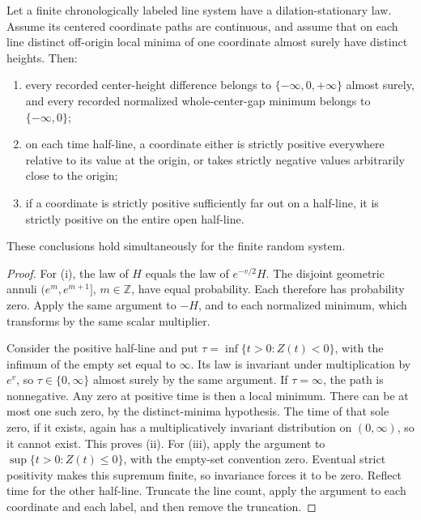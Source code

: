 \begin{lemma}\label{view:signs}
Let a finite chronologically labeled line system have a dilation-stationary
law.  Assume its centered coordinate paths are continuous, and assume that
on each line distinct off-origin local minima of one coordinate almost
surely have distinct heights.  Then:
\begin{enumerate}[label=(\roman*)]
\item every recorded center-height difference belongs to
$\{-\infty,0,+\infty\}$ almost surely, and every recorded normalized
whole-center-gap minimum belongs to $\{-\infty,0\}$;
\item on each time half-line, a coordinate either is strictly positive
everywhere relative to its value at the origin, or takes strictly negative
values arbitrarily close to the origin;
\item if a coordinate is strictly positive sufficiently far out on a
half-line, it is strictly positive on the entire open half-line.
\end{enumerate}
These conclusions hold simultaneously for the finite random system.
\end{lemma}

\begin{proof}
For (i), the law of $H$ equals the law of $e^{-v/2}H$.  The disjoint geometric
annuli $(e^m,e^{m+1}]$, $m\in\mathbb Z$, have equal probability.  Each
therefore has probability zero.  Apply the same argument to $-H$, and to
each normalized minimum, which transforms by the same scalar multiplier.

Consider the positive half-line and put
$\tau=\inf\{t>0:Z(t)<0\}$, with the infimum of the empty set equal to
$\infty$.  Its law is invariant under multiplication by $e^v$, so
$\tau\in\{0,\infty\}$ almost surely by the same argument.  If $\tau=\infty$,
the path is nonnegative.  Any zero at positive time is then a local minimum.
There can be at most one such zero, by the distinct-minima hypothesis.
The time of that sole zero, if it exists, again has a multiplicatively
invariant distribution on $(0,\infty)$, so it cannot exist.  This proves (ii).
For (iii), apply the argument to
$\sup\{t>0:Z(t)\le0\}$, with the empty-set convention zero.  Eventual strict
positivity makes this supremum finite, so invariance forces it to be zero.
Reflect time for the other half-line.  Truncate the line count, apply the
argument to each coordinate and each label, and then remove the truncation.
\end{proof}

